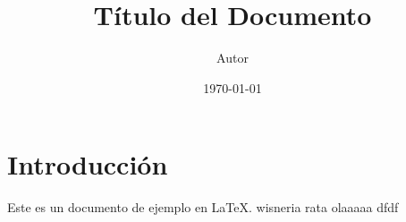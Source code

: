 \documentclass{article}
\begin{document}
\title{Título del Documento}
\author{Autor}
\date{\today}

\maketitle

\section{Introducción}
Este es un documento de ejemplo en LaTeX.
wisneria rata olaaaaa dfdf 
\end{document}
